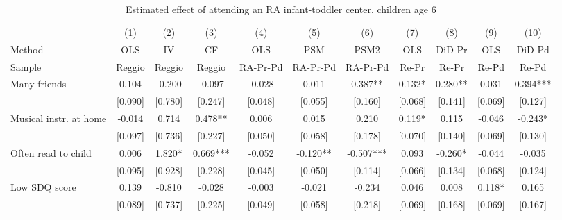 \documentclass[12pt]{article}
\begin{document}
\begin{table}[ht]
\caption{Estimated effect of attending an RA infant-toddler center, children age 6}

\label{tab:childIT}
\begin{center}
\begin{adjustbox}{width=1.2\textwidth,center=\textwidth}
\small
\begin{tabular}{l*{10}{c}}
\hline\hline
& (1) & (2) & (3) & (4) & (5) & (6) & (7) & (8) & (9) & (10) \\ 
Method & OLS & IV & CF & OLS & PSM & PSM2 & OLS & DiD Pr & OLS & DiD Pd \\
Sample & Reggio & Reggio & Reggio & RA-Pr-Pd & RA-Pr-Pd & RA-Pr-Pd & Re-Pr & Re-Pr & Re-Pd & Re-Pd \\
\hline
Many friends  & 0.104 & -0.200 & -0.097 & -0.028 & 0.011 & 0.387** & 0.132* & 0.280** & 0.031 & 0.394*** \\
 & [0.090] & [0.780] & [0.247] & [0.048] & [0.055] & [0.160] & [0.068] & [0.141] & [0.069] & [0.127] \\
Musical instr. at home & -0.014 & 0.714 & 0.478** & 0.006 & 0.015 & 0.210 & 0.119* & 0.115 & -0.046 & -0.243* \\
 & [0.097] & [0.736] & [0.227] & [0.050] & [0.058] & [0.178] & [0.070] & [0.140] & [0.069] & [0.130] \\
Often read to child
 & 0.006 & 1.820* & 0.669*** & -0.052 & -0.120** & -0.507*** & 0.093 & -0.260* & -0.044 & -0.035 \\
 & [0.095] & [0.928] & [0.228] & [0.045] & [0.050] & [0.114] & [0.066] & [0.134] & [0.068] & [0.124] \\
Low SDQ score  & 0.139 & -0.810 & -0.028 & -0.003 & -0.021 & -0.234 & 0.046 & 0.008 & 0.118* & 0.165 \\
 & [0.089] & [0.737] & [0.225] & [0.049] & [0.058] & [0.218] & [0.069] & [0.168] & [0.069] & [0.167] \\

\end{tabular}
\end{adjustbox}
\end{center}
\end{table}
\end{document}

